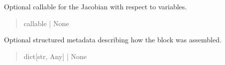 \documentclass[letterpaper,10pt,english,openany,oneside]{sphinxmanual}
\begin{document}
\begin{fulllineitems}
\begin{fulllineitems}

\pysigstartsignatures
{}
\pysigstopsignatures
\sphinxAtStartPar
Optional callable for the Jacobian with respect to variables.
\begin{quote}\begin{description}
\sphinxAtStartPar
callable | None

\end{description}\end{quote}

\end{fulllineitems}



\begin{fulllineitems}

\pysigstartsignatures
{}
\pysigstopsignatures
\sphinxAtStartPar
Optional structured metadata describing how the block was assembled.
\begin{quote}\begin{description}
\sphinxAtStartPar
dict{[}str, Any{]} | None

\end{description}\end{quote}

\end{fulllineitems}



\begin{fulllineitems}

\pysigstartsignatures
{}
\pysigstopsignatures
\end{fulllineitems}



\begin{fulllineitems}

\pysigstartsignatures
{}
\pysigstopsignatures
\end{fulllineitems}



\begin{fulllineitems}

\pysigstartsignatures
{}
\pysigstopsignatures
\end{fulllineitems}




\end{fulllineitems}
\end{document}
